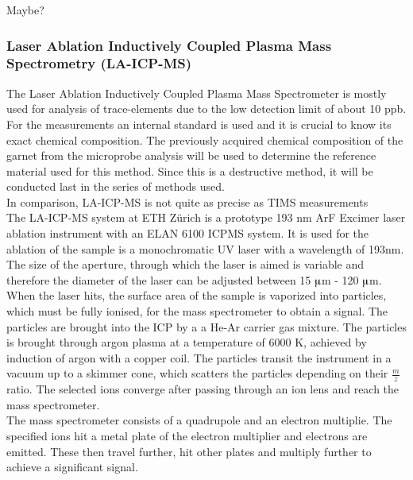 \documentclass[a4paper,11pt,titlepage]{article}
\begin{document}
Maybe?

\subsubsection{Laser Ablation Inductively Coupled Plasma Mass Spectrometry (LA-ICP-MS)}

The Laser Ablation Inductively Coupled Plasma Mass Spectrometer is mostly used for analysis of trace-elements due to the low detection limit of about 10 ppb. For the measurements an internal standard is used and it is crucial to know its exact chemical composition. The previously acquired chemical composition of the garnet from the microprobe analysis will be used to determine the reference material used for this method. Since this is a destructive method, it will be conducted last in the series of methods used. 
\\
\noindent In comparison, LA-ICP-MS is not quite as precise as TIMS measurements
\\
\noindent The LA-ICP-MS system at ETH Zürich is a prototype 193 nm ArF Excimer laser ablation instrument with an ELAN 6100 ICPMS system. It is used for the ablation of the sample is a monochromatic UV laser with a wavelength of 193nm. The size of the aperture, through which the laser is aimed is variable and therefore the diameter of the laser can be adjusted between 15 $\muup$m - 120 $\muup$m.
\\
\noindent When the laser hits, the surface area of the sample is vaporized into particles, which must be fully ionised, for the mass spectrometer to obtain a signal. The particles are brought into the ICP by a a He-Ar carrier gas mixture. The particles is brought through argon plasma at a temperature of 6000 K, achieved by induction of argon with a copper coil. The particles transit the instrument in a vacuum up to a skimmer cone, which scatters the particles depending on their \( \frac{m}{z} \) ratio. The selected ions converge after passing through an ion lens and reach the mass spectrometer.
\\
\noindent The mass spectrometer consists of a quadrupole and an electron multiplie. The specified ions hit a metal plate of the electron multiplier and electrons are emitted. These then travel further, hit other plates and multiply further to achieve a significant signal.\citep{Yang2018}



\end{document}
